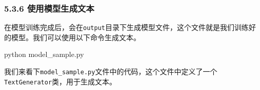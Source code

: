 \documentclass[
]{article}
\newenvironment{Shaded}{}{}
\newcommand{\ExtensionTok}[1]{#1}
\newcommand{\NormalTok}[1]{#1}
\begin{document}
\subsubsection{5.3.6
使用模型生成文本}\label{ux4f7fux7528ux6a21ux578bux751fux6210ux6587ux672c}

在模型训练完成后，会在\texttt{output}目录下生成模型文件，这个文件就是我们训练好的模型。我们可以使用以下命令生成文本。

\begin{Shaded}
\begin{Highlighting}[]
\ExtensionTok{python}\NormalTok{ model\_sample.py}
\end{Highlighting}
\end{Shaded}

我们来看下\texttt{model\_sample.py}文件中的代码，这个文件中定义了一个\texttt{TextGenerator}类，用于生成文本。
\end{document}
